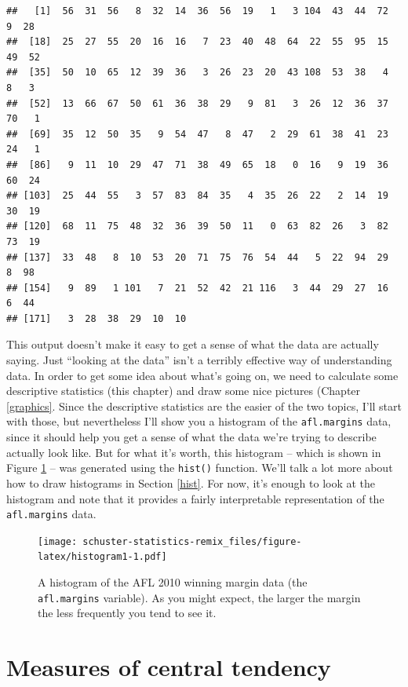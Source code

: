 \documentclass[
]{book}
\begin{document}
\begin{verbatim}
##   [1]  56  31  56   8  32  14  36  56  19   1   3 104  43  44  72   9  28
##  [18]  25  27  55  20  16  16   7  23  40  48  64  22  55  95  15  49  52
##  [35]  50  10  65  12  39  36   3  26  23  20  43 108  53  38   4   8   3
##  [52]  13  66  67  50  61  36  38  29   9  81   3  26  12  36  37  70   1
##  [69]  35  12  50  35   9  54  47   8  47   2  29  61  38  41  23  24   1
##  [86]   9  11  10  29  47  71  38  49  65  18   0  16   9  19  36  60  24
## [103]  25  44  55   3  57  83  84  35   4  35  26  22   2  14  19  30  19
## [120]  68  11  75  48  32  36  39  50  11   0  63  82  26   3  82  73  19
## [137]  33  48   8  10  53  20  71  75  76  54  44   5  22  94  29   8  98
## [154]   9  89   1 101   7  21  52  42  21 116   3  44  29  27  16   6  44
## [171]   3  28  38  29  10  10
\end{verbatim}

This output doesn't make it easy to get a sense of what the data are actually saying. Just ``looking at the data'' isn't a terribly effective way of understanding data. In order to get some idea about what's going on, we need to calculate some descriptive statistics (this chapter) and draw some nice pictures (Chapter \ref{graphics}. Since the descriptive statistics are the easier of the two topics, I'll start with those, but nevertheless I'll show you a histogram of the \texttt{afl.margins} data, since it should help you get a sense of what the data we're trying to describe actually look like. But for what it's worth, this histogram -- which is shown in Figure \ref{fig:histogram1} -- was generated using the \texttt{hist()} function. We'll talk a lot more about how to draw histograms in Section \ref{hist}. For now, it's enough to look at the histogram and note that it provides a fairly interpretable representation of the \texttt{afl.margins} data.

\begin{figure}
\centering
\texttt{[image: schuster-statistics-remix\_files/figure-latex/histogram1-1.pdf]}
\caption{\label{fig:histogram1}A histogram of the AFL 2010 winning margin data (the \texttt{afl.margins} variable). As you might expect, the larger the margin the less frequently you tend to see it.}
\end{figure}

\hypertarget{centraltendency}{%
\section{Measures of central tendency}\label{centraltendency}}
\end{document}
